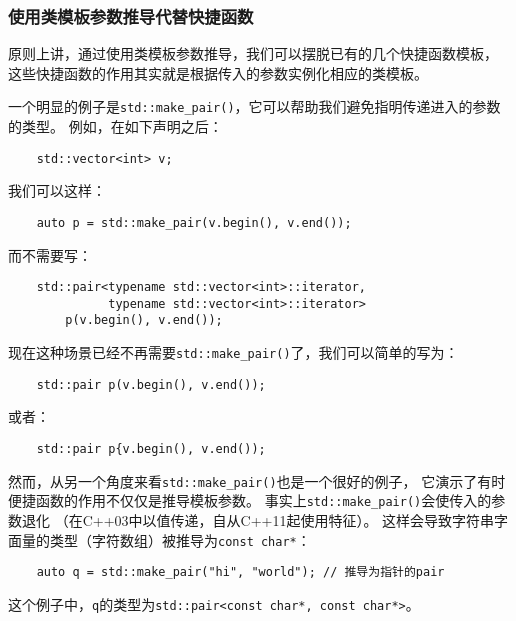 \subsubsection{使用类模板参数推导代替快捷函数}\label{ch9.1.4}
原则上讲，通过使用类模板参数推导，我们可以摆脱已有的几个快捷函数模板，
这些快捷函数的作用其实就是根据传入的参数实例化相应的类模板。

一个明显的例子是\texttt{std::make\_pair()}，它可以帮助我们避免指明传递进入的参数的类型。
例如，在如下声明之后：
\begin{lstlisting}
    std::vector<int> v;
\end{lstlisting}
我们可以这样：
\begin{lstlisting}
    auto p = std::make_pair(v.begin(), v.end());
\end{lstlisting}
而不需要写：
\begin{lstlisting}
    std::pair<typename std::vector<int>::iterator,
              typename std::vector<int>::iterator>
        p(v.begin(), v.end());
\end{lstlisting}
现在这种场景已经不再需要\texttt{std::make\_pair()}了，我们可以简单的写为：
\begin{lstlisting}
    std::pair p(v.begin(), v.end());
\end{lstlisting}
或者：
\begin{lstlisting}
    std::pair p{v.begin(), v.end());
\end{lstlisting}

然而，从另一个角度来看\texttt{std::make\_pair()}也是一个很好的例子，
它演示了有时便捷函数的作用不仅仅是推导模板参数。
事实上\texttt{std::make\_pair()}会使传入的参数退化
（在C++03中以值传递，自从C++11起使用特征）。
这样会导致字符串字面量的类型（字符数组）被推导为\texttt{const char*}：
\begin{lstlisting}
    auto q = std::make_pair("hi", "world"); // 推导为指针的pair
\end{lstlisting}
这个例子中，\texttt{q}的类型为\texttt{std::pair<const char*, const char*>}。

